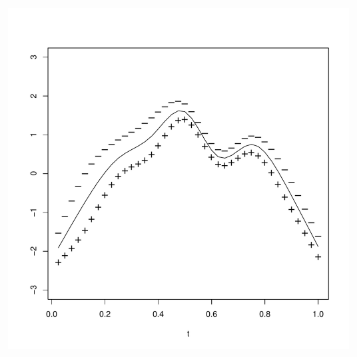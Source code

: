 \begin{figure}
\begin{subfigure}[b]{0.32\textwidth}
                \caption{}
                \label{}
        \end{subfigure}
         \begin{subfigure}[b]{0.32\textwidth}
                \centering
                \includegraphics[width=0.99\textwidth]{Images-future-work/ef2pn.pdf}
                \caption{}
                \label{}
        \end{subfigure}%
        

\end{figure}
